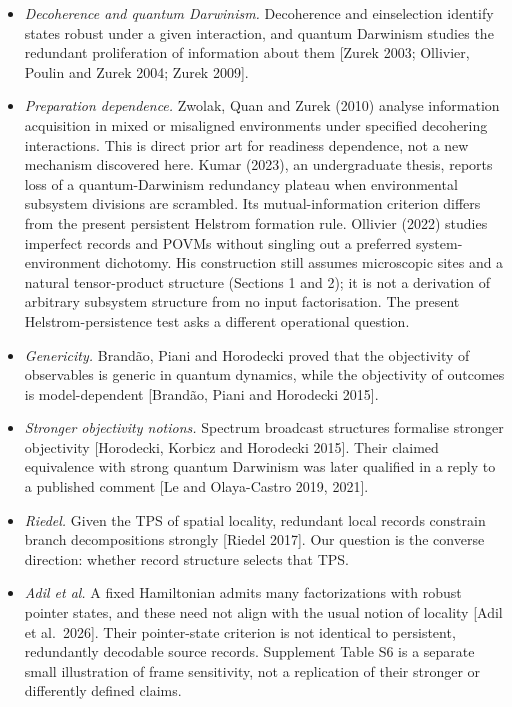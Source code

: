 \documentclass[
  10pt,
  a4paper,
]{article}
\providecommand{\tightlist}{%
  \setlength{\itemsep}{0pt}\setlength{\parskip}{0pt}}
\begin{document}
\begin{itemize}
\tightlist
\item
  \emph{Decoherence and quantum Darwinism.} Decoherence and einselection
  identify states robust under a given interaction, and quantum
  Darwinism studies the redundant proliferation of information about
  them {[}Zurek 2003; Ollivier, Poulin and Zurek 2004; Zurek 2009{]}.
\item
  \emph{Preparation dependence.} Zwolak, Quan and Zurek (2010) analyse
  information acquisition in mixed or misaligned environments under
  specified decohering interactions. This is direct prior art for
  readiness dependence, not a new mechanism discovered here. Kumar
  (2023), an undergraduate thesis, reports loss of a quantum-Darwinism
  redundancy plateau when environmental subsystem divisions are
  scrambled. Its mutual-information criterion differs from the present
  persistent Helstrom formation rule. Ollivier (2022) studies imperfect
  records and POVMs without singling out a preferred system-environment
  dichotomy. His construction still assumes microscopic sites and a
  natural tensor-product structure (Sections 1 and 2); it is not a
  derivation of arbitrary subsystem structure from no input
  factorisation. The present Helstrom-persistence test asks a different
  operational question.
\item
  \emph{Genericity.} Brandão, Piani and Horodecki proved that the
  objectivity of observables is generic in quantum dynamics, while the
  objectivity of outcomes is model-dependent {[}Brandão, Piani and
  Horodecki 2015{]}.
\item
  \emph{Stronger objectivity notions.} Spectrum broadcast structures
  formalise stronger objectivity {[}Horodecki, Korbicz and Horodecki
  2015{]}. Their claimed equivalence with strong quantum Darwinism was
  later qualified in a reply to a published comment {[}Le and
  Olaya-Castro 2019, 2021{]}.
\item
  \emph{Riedel.} Given the TPS of spatial locality, redundant local
  records constrain branch decompositions strongly {[}Riedel 2017{]}.
  Our question is the converse direction: whether record structure
  selects that TPS.
\item
  \emph{Adil et al.} A fixed Hamiltonian admits many factorizations with
  robust pointer states, and these need not align with the usual notion
  of locality {[}Adil et al.~2026{]}. Their pointer-state criterion is
  not identical to persistent, redundantly decodable source records.
  Supplement Table S6 is a separate small illustration of frame
  sensitivity, not a replication of their stronger or differently
  defined claims.
\end{itemize}
\end{document}
